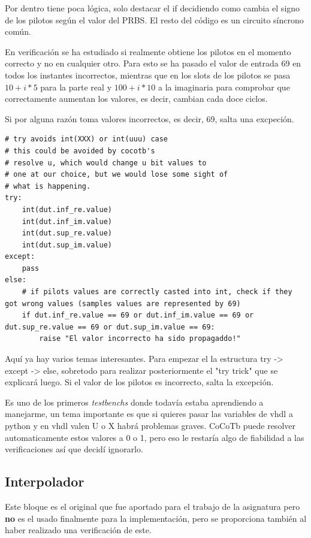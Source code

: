 \documentclass[11pt]{scrartcl} %
\begin{document}
\begin{preview}
Por dentro tiene poca lógica, solo destacar el if decidiendo como cambia el signo de los pilotos según el valor del PRBS. El resto del código es un circuito síncrono común.

En verificación se ha estudiado si realmente obtiene los pilotos en el momento correcto y no en cualquier otro. Para esto se ha pasado el valor de entrada 69 en todos los instantes incorrectos, mientras que en los slots de los pilotos se pasa $10 + i*5$ para la parte real y $100 + i*10$ a la imaginaria para comprobar que correctamente aumentan los valores, es decir, cambian cada doce ciclos.

Si por alguna razón toma valores incorrectos, es decir, 69, salta una excpeción. 

\begin{verbatim}
# try avoids int(XXX) or int(uuu) case
# this could be avoided by cocotb's 
# resolve u, which would change u bit values to
# one at our choice, but we would lose some sight of 
# what is happening.
try:
	int(dut.inf_re.value)
	int(dut.inf_im.value)
	int(dut.sup_re.value)
	int(dut.sup_im.value)
except:
	pass
else:
	# if pilots values are correctly casted into int, check if they got wrong values (samples values are represented by 69)
	if dut.inf_re.value == 69 or dut.inf_im.value == 69 or dut.sup_re.value == 69 or dut.sup_im.value == 69:        
		raise "El valor incorrecto ha sido propagaddo!"
\end{verbatim}

Aquí ya hay varios temas interesantes. Para empezar el la estructura try -> except -> else, sobretodo para realizar posteriormente el "try trick" que se explicará luego. Si el valor de los pilotos es incorrecto, salta la excepción.

Es uno de los primeros \emph{testbenchs} donde todavía estaba aprendiendo a manejarme, un tema importante es que si quieres pasar las variables de vhdl a python y en vhdl valen U o X habrá problemas graves. CoCoTb puede resolver automaticamente estos valores a 0 o 1, pero eso le restaría algo de fiabilidad a las verificaciones así que decidí ignorarlo.

\subsection{Interpolador}

Este bloque es el original que fue aportado para el trabajo de la asignatura pero \textbf{no} es el usado finalmente para la implementación, pero se proporciona también al haber realizado una verificación de este.


\end{preview}
\end{document}

